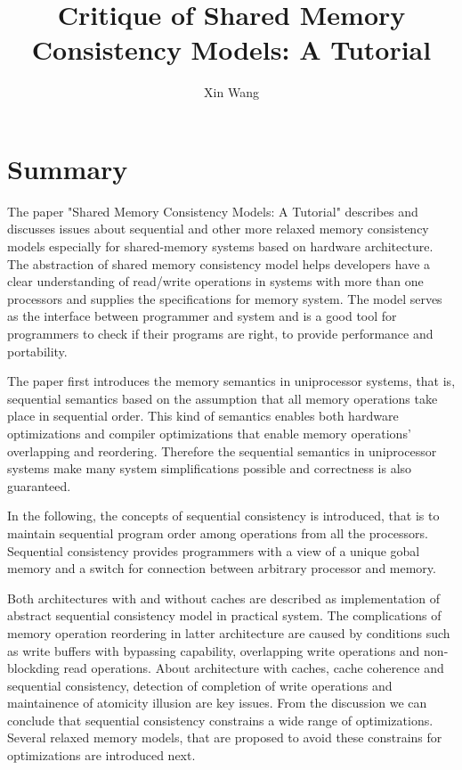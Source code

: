 \documentclass[10pt, letterpaper]{article}
\title{Critique of Shared Memory Consistency Models: A Tutorial}
\author{Xin Wang}
\date{} %
\begin{document}
\maketitle

\section{Summary}
The paper "Shared Memory Consistency Models: A Tutorial"\cite{adve1996shared} describes and discusses
issues about sequential and other more relaxed memory consistency
models especially for shared-memory systems based on hardware architecture. The abstraction of shared memory
consistency model helps developers have a clear understanding of read/write operations in systems with more than
one processors and supplies the specifications for memory system. The model serves as the interface between
programmer and system and is a good tool for programmers to check if their programs are right, to provide
performance and portability.

The paper first introduces the memory semantics in uniprocessor systems, that is, sequential semantics based on
the assumption that all memory operations take place in sequential order. This kind of semantics enables
both hardware optimizations and compiler optimizations that enable memory operations' overlapping and
reordering. Therefore the sequential semantics in uniprocessor systems make many system simplifications possible
and correctness is also guaranteed. 

In the following, the concepts of sequential consistency is introduced, that
is to maintain sequential program order among operations from all the processors. Sequential consistency
provides programmers with a view of a unique gobal memory and a switch for connection between arbitrary
processor and
memory. 

Both architectures with and without caches are described as implementation of abstract sequential consistency
model in practical system. The complications of memory operation reordering in
latter architecture are caused by conditions
such as write buffers with bypassing capability, overlapping write operations and non-blockding read operations.
About architecture with caches, cache coherence and sequential consistency, detection of completion of
write operations and maintainence of atomicity illusion are key issues. From the discussion we can conclude that sequential
consistency constrains a wide range of optimizations. Several relaxed memory models, that are proposed to avoid
these constrains for optimizations are introduced next.
\end{document}
